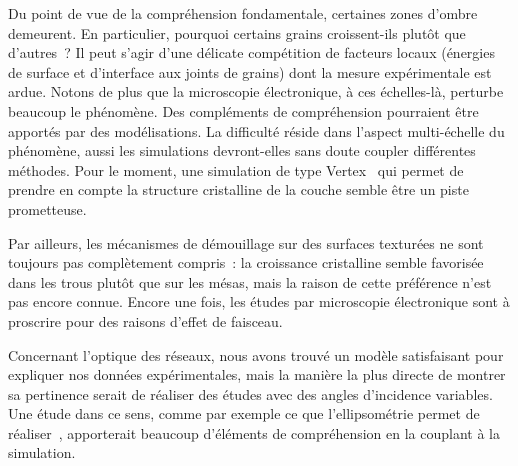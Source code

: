 \vspace{12pt}
Du point de vue de la compréhension fondamentale, certaines zones d'ombre demeurent. En particulier, pourquoi certains grains croissent-ils plutôt que d'autres~? Il peut s'agir d'une délicate compétition de facteurs locaux (énergies de surface et d'interface aux joints de grains) dont la mesure expérimentale est ardue. Notons de plus que la microscopie électronique, à ces échelles-là, perturbe beaucoup le phénomène. Des compléments de compréhension pourraient être apportés par des modélisations. La difficulté réside dans l'aspect multi-échelle du phénomène, aussi les simulations devront-elles sans doute coupler différentes méthodes. Pour le moment, une simulation de type Vertex~\cite{weygand1998vertex} qui permet de prendre en compte la structure cristalline de la couche semble être un piste prometteuse.\par 
Par ailleurs, les mécanismes de démouillage sur des surfaces texturées ne sont toujours pas complètement compris~: la croissance cristalline semble favorisée dans les trous plutôt que sur les mésas, mais la raison de cette préférence n'est pas encore connue. Encore une fois, les études par microscopie électronique sont à proscrire pour des raisons d'effet de faisceau.\par 
Concernant l'optique des réseaux, nous avons trouvé un modèle satisfaisant pour expliquer nos données expérimentales, mais la manière la plus directe de montrer sa pertinence serait de réaliser des études avec des angles d'incidence variables. Une étude dans ce sens, comme par exemple ce que l'ellipsométrie permet de réaliser~\cite{brakstad2015dispersion}, apporterait beaucoup d'éléments de compréhension en la couplant à la simulation.\par  
\newpage


